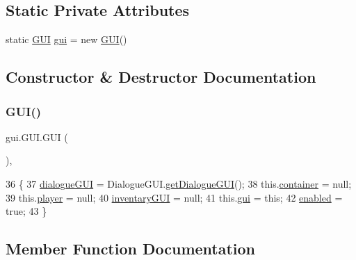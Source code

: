 \subsection*{Static Private Attributes}
\begin{DoxyCompactItemize}
\item 
static \mbox{\hyperlink{classgui_1_1_g_u_i}{G\+UI}} \mbox{\hyperlink{classgui_1_1_g_u_i_aa2b3a687a3eb5fbf6b316d9414c864b3}{gui}} = new \mbox{\hyperlink{classgui_1_1_g_u_i}{G\+UI}}()
\end{DoxyCompactItemize}


\subsection{Constructor \& Destructor Documentation}
\mbox{\label{classgui_1_1_g_u_i_a2615d0a83cbc5e536a84b34f4f5fed77}} 
\subsubsection{\texorpdfstring{G\+U\+I()}{GUI()}}
{\footnotesize\ttfamily gui.\+G\+U\+I.\+G\+UI (\begin{DoxyParamCaption}{ }\end{DoxyParamCaption})\hspace{0.3cm}{\ttfamily [inline]}, {\ttfamily [private]}}


\begin{DoxyCode}
36                   \{
37         \mbox{\hyperlink{classgui_1_1_g_u_i_ae48d5f580a490dd73bc59e64937cc46f}{dialogueGUI}} = DialogueGUI.\mbox{\hyperlink{classgui_1_1_dialogue_g_u_i_a274435a784994cf896865d71e3e6f5a3}{getDialogueGUI}}();
38         this.\mbox{\hyperlink{classgui_1_1_g_u_i_acaa3c69a02ef67d6ebd11fcbcc87049d}{container}} = null;
39         this.\mbox{\hyperlink{classgui_1_1_g_u_i_a96b66f816e243b9bae9754fba26f5cd2}{player}} = null;
40         \mbox{\hyperlink{classgui_1_1_g_u_i_afaa90863a9a224c2a8ebb22ae6a71d8a}{inventaryGUI}} = null;
41         this.\mbox{\hyperlink{namespacegui}{gui}} = \textcolor{keyword}{this};
42         \mbox{\hyperlink{classgui_1_1_g_u_i_ac666fbd257937cf3560d48acafe419ce}{enabled}} = \textcolor{keyword}{true};
43     \}
\end{DoxyCode}


\subsection{Member Function Documentation}
\mbox{\label{classgui_1_1_g_u_i_a06a3180f0f9b8f5dfa75729596269107}} 
